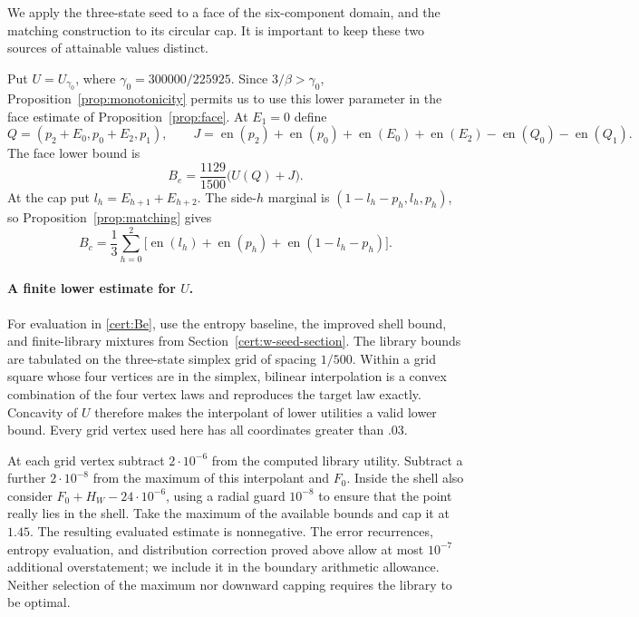 \documentclass[11pt]{article}
\numberwithin{equation}{section}
\theoremstyle{definition}
\theoremstyle{remark}
\begin{document}
We apply the three-state seed to a face of the six-component domain, and
the matching construction to its circular cap.  It is important to keep
these two sources of attainable values distinct.

Put $U=U_{\gamma_0}$, where $\gamma_0=300000/225925$.  Since
$3/\beta>\gamma_0$, Proposition~\ref{prop:monotonicity} permits us to use
this lower parameter in the face estimate of Proposition~\ref{prop:face}.
At $E_1=0$ define
\begin{equation}\label{cert:face-data}
 Q=(p_2+E_0,p_0+E_2,p_1),\qquad
 J=\operatorname{en}(p_2)+\operatorname{en}(p_0)+\operatorname{en}(E_0)+\operatorname{en}(E_2)-\operatorname{en}(Q_0)-\operatorname{en}(Q_1).
\end{equation}
The face lower bound is
\begin{equation}\label{cert:Be}
 B_e=\frac{1129}{1500}\bigl(U(Q)+J\bigr).
\end{equation}
At the cap put $l_h=E_{h+1}+E_{h+2}$.  The side-$h$ marginal is
$(1-l_h-p_h,l_h,p_h)$, so Proposition~\ref{prop:matching} gives
\begin{equation}\label{cert:Bc}
 B_c=\frac13\sum_{h=0}^2
       \bigl[\operatorname{en}(l_h)+\operatorname{en}(p_h)+\operatorname{en}(1-l_h-p_h)\bigr].
\end{equation}

\paragraph{A finite lower estimate for $U$.}
For evaluation in \eqref{cert:Be}, use the entropy baseline, the improved
shell bound, and finite-library mixtures from
Section~\ref{cert:w-seed-section}.
The library bounds are tabulated on the three-state simplex grid of spacing
$1/500$.  Within a grid square whose four vertices are in the simplex,
bilinear interpolation is a convex combination of the four vertex laws
and reproduces the target law exactly.  Concavity of $U$ therefore makes
the interpolant of lower utilities a valid lower bound.  Every grid vertex
used here has all coordinates greater than $.03$.

At each grid vertex subtract $2\cdot10^{-6}$ from the computed library
utility.  Subtract a further $2\cdot10^{-8}$ from the maximum of this
interpolant and $F_0$.  Inside the shell also consider
$F_0+H_W-24\cdot10^{-6}$, using a radial guard $10^{-8}$ to ensure that the
point really lies in the shell.  Take the maximum of the available bounds
and cap it at $1.45$.  The resulting evaluated estimate is nonnegative.
The error recurrences, entropy evaluation, and distribution correction
proved above allow at most $10^{-7}$ additional overstatement; we include
it in the boundary arithmetic allowance.  Neither selection of the maximum
nor downward capping requires the library to be optimal.
\end{document}
